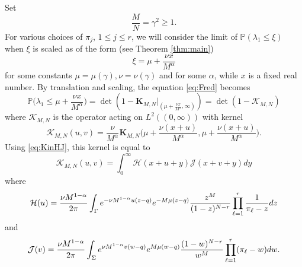 \documentclass[11pt]{article}
\begin{document}
Set
\begin{equation}\label{eq:MN}
  \frac{M}{N}=\gamma^2\ge 1.
\end{equation}
For various choices of $\pi_j$, $1\le j\le r$, we will consider
the limit of $\mathbb{P}(\lambda_1\le \xi)$ when $\xi$ is scaled
as of the form (see Theorem \ref{thm:main})
\begin{equation}\label{eq:scalegeneral}
  \xi= \mu+\frac{\nu x}{M^\alpha}
\end{equation}
for some constants $\mu=\mu(\gamma), \nu=\nu(\gamma)$ and for some
$\alpha$, while $x$ is a fixed real number. By translation and
scaling, the equation \eqref{eq:Fred} becomes
\begin{equation}
  \mathbb{P}\biggl(\lambda_1 \le \mu+\frac{\nu x}{M^\alpha}\biggr)
  = \det( 1-\mathbf{K}_{M,N}|_{(\mu+\frac{\nu x}{M^\alpha}, \infty)})
  = \det(1 - \mathcal{K}_{M,N})
\end{equation}
where $\mathcal{K}_{M,N}$ is the operator acting on
$L^2((0,\infty))$ with kernel
\begin{equation}
  \mathcal{K}_{M,N}(u,v) = \frac{\nu}{M^{\alpha}}
  \mathbf{K}_{M,N} \biggl(\mu+ \frac{\nu (x+u)}{M^\alpha},
  \mu+ \frac{\nu (x+u)}{M^\alpha}\biggr).
\end{equation}
Using \eqref{eq:KinHJ}, this kernel is equal to
\begin{equation}\label{eq:KcalinHJ}
  \mathcal{K}_{M,N}(u,v) =\int_0^\infty \mathcal{H}(x+u+y)
  \mathcal{J}(x+v+y) dy
\end{equation}
where
\begin{equation}\label{eq:Hcal}
  \mathcal{H}(u) = \frac{\nu M^{1-\alpha}}{2\pi}
  \int_\Gamma e^{-\nu M^{1-\alpha} u(z-q)} e^{-M\mu (z-q)}
  \frac{z^M}{(1-z)^{N-r}}
  \prod_{\ell=1}^r \frac1{\pi_\ell-z} dz
\end{equation}
and
\begin{equation}\label{eq:Jcal}
  \mathcal{J}(v) = \frac{\nu M^{1-\alpha}}{2\pi} \int_{\Sigma}
  e^{\nu M^{1-\alpha} v(w-q)} e^{M\mu (w-q)}\frac{(1-w)^{N-r}}{w^M}
  \prod_{\ell=1}^r (\pi_\ell-w) dw.
\end{equation}
\end{document}
